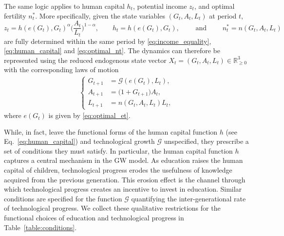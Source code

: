 \documentclass[a4paper,fleqn]{cas-sc}
\begin{document}
The same logic applies to human capital $h_t$, potential income $z_t$, and optimal fertility $n^*_t$.
More specifically, given the state variables $(G_t,A_t,L_t)$ at period $t$,
%
\begin{equation}\label{eq:choice_variables}
    z_t=h(e(G_t),G_t)^{\alpha}
    \bigg(\frac{A_t}{L_t}\bigg)^{1-\alpha},\qquad h_t=h(e(G_t),G_t),\qquad \text{ and }\qquad n_t^*=n(G_t,A_t,L_t)
\end{equation}
are fully determined within the same period by \eqref{eq:income_equality}, \eqref{eq:human_capital} and \eqref{eq:optimal_nt}.
%
The dynamics can therefore be represented using the reduced endogenous state vector $X_t=(G_t,A_t,L_t)\in\mathbb R_{\geq0}^3$ with the corresponding laws of motion
%
\begin{align}\label{eq:galor_family}
    \begin{cases}
        G_{t+1} &= \mathcal G(e(G_t),L_t),\\
        A_{t+1} &= \big(1 + G_{t+1}\big)A_t,\\
        L_{t+1} &= n(G_t,A_t,L_t)L_t,
    \end{cases}
\end{align}
%
where $e(G_t)$ is given by \eqref{eq:optimal_et}.


While, in fact, \citet{Galor2000} leave the functional forms of the human capital function $h$ (see Eq.~\eqref{eq:human_capital}) and technological growth $\mathcal G$ unspecified, they prescribe a set of conditions they must satisfy. 
In particular, the human capital function $h$ captures a central mechanism in the GW model.
As education raises the human capital of children, technological progress erodes the usefulness of knowledge acquired from the previous generation. This erosion effect is the channel through which technological progress creates an incentive to invest in education.
Similar conditions are specified for the function $\mathcal G$ quantifying the inter-generational rate of technological progress.
We collect these qualitative restrictions for the functional choices of education and technological progress in Table~\ref{table:conditions}.
\end{document}
